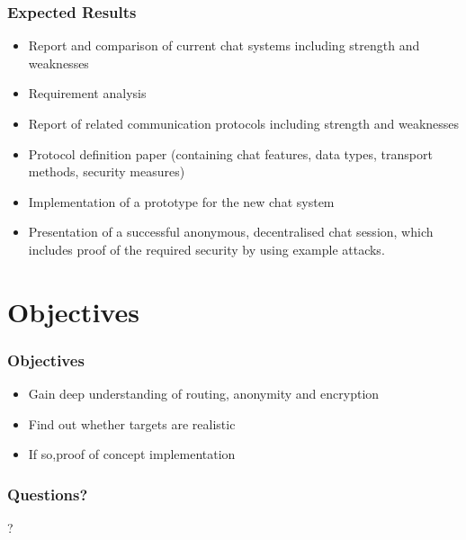 \documentclass{beamer}
\begin{document}
\frame
{
  \frametitle{Expected Results}
  \begin{itemize}
    \item Report and comparison of current chat systems including strength and weaknesses
    \item Requirement analysis
    \item Report of related communication protocols including strength and weaknesses
    \item Protocol definition paper (containing chat features,
        data types, transport methods, security measures)
    \item Implementation of a prototype for the new chat system
    \item Presentation of a successful anonymous, decentralised chat session, which
       includes proof of the required security by using example attacks.
  \end{itemize}
}

\section{Objectives}
\frame
{
  \frametitle{Objectives}
  \begin{itemize}
    \item Gain deep understanding of routing, anonymity and encryption
    \item Find out whether targets are realistic
    \item If so,\pause proof of concept implementation
  \end{itemize}
}

\frame
{
  \frametitle{Questions?}
  \begin{center}
  ?
  \end{center}
}
\end{document}
